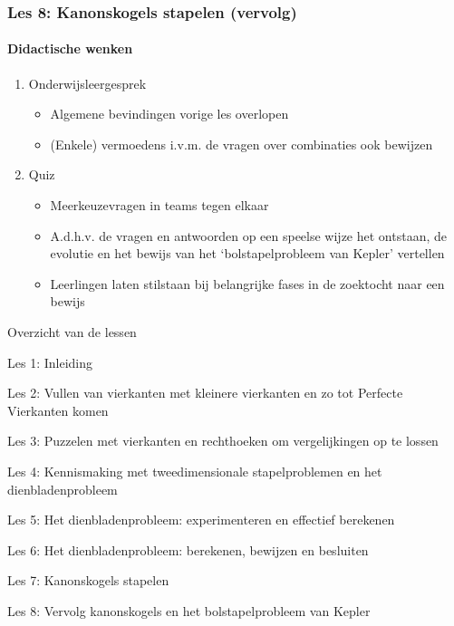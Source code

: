 \documentclass[dutch]{beamer}
\begin{document}
\begin{frame}
\frametitle{Les 8: Kanonskogels stapelen {\small (vervolg)}}
\framesubtitle{Didactische wenken}

\begin{enumerate}
	\item Onderwijsleergesprek
	\begin{itemize}
	\item Algemene bevindingen vorige les overlopen
	\item (Enkele) vermoedens i.v.m. de vragen over combinaties ook bewijzen
\end{itemize}
	\item{Quiz}
	\begin{itemize}
	\item Meerkeuzevragen in teams tegen elkaar
	\item A.d.h.v. de vragen en antwoorden op een speelse wijze het ontstaan, de evolutie en het bewijs van het \textquoteleft bolstapelprobleem van Kepler' vertellen
	\item Leerlingen laten stilstaan bij belangrijke fases in de zoektocht naar een bewijs
\end{itemize}
\end{enumerate}

\end{frame}

%




\begin{frame}
{Overzicht van de lessen}
\begin{list}{\quad}{}
\item Les 1: Inleiding
\item Les 2: Vullen van vierkanten met kleinere vierkanten en zo tot Perfecte Vierkanten komen
\item Les 3: Puzzelen met vierkanten en rechthoeken om vergelijkingen op te lossen
\item Les 4: Kennismaking met tweedimensionale stapelproblemen en het dienbladenprobleem 
\item Les 5: Het dienbladenprobleem: experimenteren en effectief berekenen
\item Les 6: Het dienbladenprobleem: berekenen, bewijzen en besluiten
\item Les 7: Kanonskogels stapelen
\item Les 8: Vervolg kanonskogels en het bolstapelprobleem van Kepler
\end{list}
\end{frame}
\end{document}
